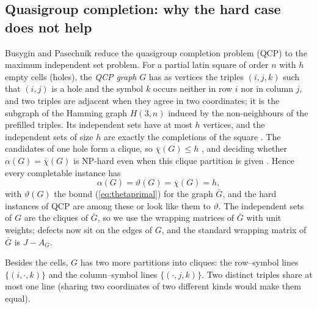 \documentclass[11pt]{article}
\theoremstyle{definition}
\theoremstyle{remark}
\begin{document}
\subsection{Quasigroup completion: why the hard case does not help}
\label{sec:qcp}

Busygin and Pasechnik \cite{BP03} reduce the quasigroup completion problem
(QCP) to the maximum independent set problem. For a partial latin square of
order $n$ with $h$ empty cells (holes), the {\em QCP graph} $G$ has as
vertices the triples $(i,j,k)$ such that $(i,j)$ is a hole and the symbol $k$
occurs neither in row $i$ nor in column $j$, and two triples are adjacent when
they agree in two coordinates; it is the subgraph of the Hamming graph
$H(3,n)$ induced by the non-neighbours of the prefilled triples. Its
independent sets have at most $h$ vertices, and the independent sets of size
$h$ are exactly the completions of the square \cite[Lemma~2]{BP03}. The
candidates of one hole form a clique, so $\overline{\chi}(G)\leq h$
\cite[Lemma~3]{BP03}, and deciding whether $\alpha(G)=\overline{\chi}(G)$ is
NP-hard even when this clique partition is given \cite[Theorem~1]{BP03}.
Hence every completable instance has
\[ \alpha(G)=\vartheta(G)=\overline{\chi}(G)=h, \]
with $\vartheta(G)$ the bound (\ref{eq:thetaprimal}) for the graph $\bar G$,
and the hard instances of QCP are among these or look like them to
$\vartheta$. The independent sets of $G$ are the cliques of $\bar G$, so we
use the wrapping matrices of $\bar G$ with unit weights; defects now sit on
the edges of $G$, and the standard wrapping matrix of $\bar G$ is
$J-A_G$.

Besides the cells, $G$ has two more partitions into cliques: the
row--symbol lines $\{(i,\cdot,k)\}$ and the column--symbol lines
$\{(\cdot,j,k)\}$. Two distinct triples share at most one line (sharing two
coordinates of two different kinds would make them equal).
\end{document}
